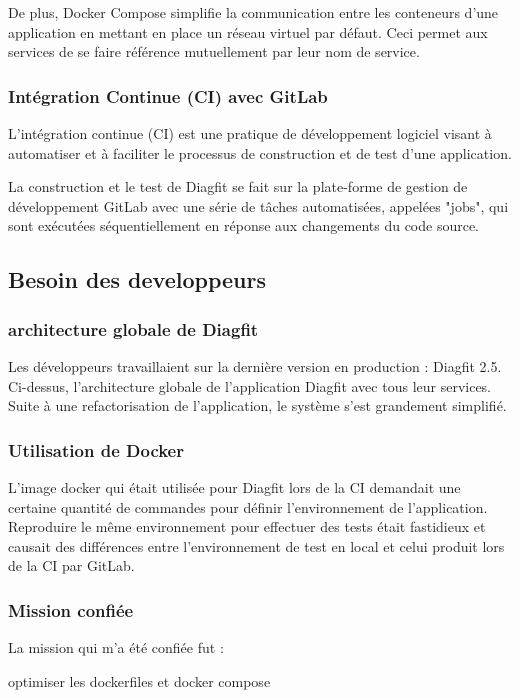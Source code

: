 De plus, Docker Compose simplifie la communication entre les conteneurs d'une application en mettant en place un réseau virtuel par défaut. Ceci permet aux services de se faire référence mutuellement par leur nom de service.

\subsubsection{Intégration Continue (CI) avec GitLab}
L'intégration continue (CI) est une pratique de développement logiciel visant à automatiser et à faciliter le processus de construction et de test d'une application.

La construction et le test de Diagfit se fait sur la plate-forme de gestion de développement GitLab avec une série de tâches automatisées, appelées "jobs", qui sont exécutées séquentiellement en réponse aux changements du code source.


\subsection{Besoin des developpeurs}
\subsubsection{architecture globale de Diagfit}
Les développeurs travaillaient sur la dernière version en production : Diagfit 2.5.
Ci-dessus, l'architecture globale de l'application Diagfit avec tous leur services.
Suite à une refactorisation de l'application, le système s'est grandement simplifié.

\subsubsection{Utilisation de Docker}
L'image docker qui était utilisée pour Diagfit lors de la CI demandait une certaine quantité de commandes pour définir l'environnement de l'application.
Reproduire le même environnement pour effectuer des tests était fastidieux et causait des différences entre l'environnement de test en local et celui produit lors de la CI par GitLab.

\subsubsection{Mission confiée}
La mission qui m'a été confiée fut :

optimiser les dockerfiles et docker compose

